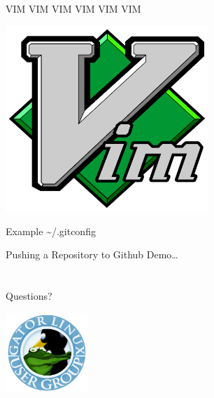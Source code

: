 \documentclass[aspectratio=43]{beamer}
\begin{document}
\begin{frame}{VIM VIM VIM VIM VIM VIM}
    \begin{center}
        \includegraphics[height=7cm]{resources/vim_logo.pdf}
    \end{center}
\end{frame}

\begin{frame}{Example \textasciitilde/.gitconfig}
    
\end{frame}

\begin{frame}{Pushing a Repository to Github}
    Demo\ldots
\end{frame}

\section{}
\begin{frame}{Questions?}
\begin{center}
    \includegraphics[height=3cm]{resources/gatorlug_logo.png}
\end{center}
\end{frame}
\end{document}
